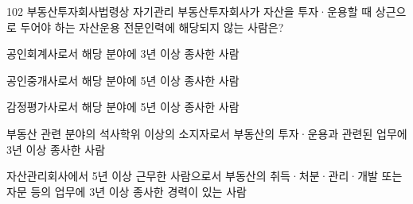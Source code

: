 \begin{question}{102}
부동산투자회사법령상 자기관리 부동산투자회사가 자산을 투자·운용할 때 상근으로 두어야 하는 자산운용 전문인력에 해당되지 않는 사람은?
\begin{choices}
  \item 공인회계사로서 해당 분야에 3년 이상 종사한 사람
  \item 공인중개사로서 해당 분야에 5년 이상 종사한 사람
  \item 감정평가사로서 해당 분야에 5년 이상 종사한 사람
  \item 부동산 관련 분야의 석사학위 이상의 소지자로서 부동산의 투자·운용과 관련된 업무에 3년 이상 종사한 사람
  \item 자산관리회사에서 5년 이상 근무한 사람으로서 부동산의 취득·처분·관리·개발 또는 자문 등의 업무에 3년 이상 종사한 경력이 있는 사람
\end{choices}
\end{question}
